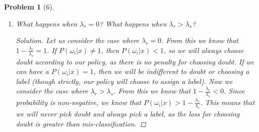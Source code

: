 \documentclass[11pt]{article}
\theoremstyle{quest}
\newtheorem*{problem}{Problem}
\newenvironment{solution}
  {\begin{mdframed}\begin{proof}[Solution]}
  {\end{proof}\end{mdframed}}
\begin{document}
\begin{problem}[6]
\begin{enumerate}[label=(\alph*)]
\begin{solution}
\begin{align*}
            \end{align*}
            The label we pick in this case minimizes $1 - P(\omega_i | x)$, which maximizes $P(\omega_i | x)$. That is, we pick the label $i$ such that
            \begin{align*}
                P(\omega_i | x) \ge P(\omega_j | x), \forall j
            \end{align*}
            \newline
            If $P(\omega_i | x) < 1 - \frac{\lambda_r}{\lambda_s}$, we choose doubt. This is the policy that minimizes risk, which is the same as the proposed policy.
            \end{solution}
        \item What happens when $\lambda_r = 0$? What happens when $\lambda_r > \lambda_s$?
            \begin{solution}
            Let us consider the case where $\lambda_r = 0$. From this we know that $1 - \frac{\lambda_r}{\lambda_s} = 1$. If $P(\omega_i | x) \neq 1$, then $P(\omega_i | x) < 1$, so we will always choose doubt according to our policy, as there is no penalty for choosing doubt. If we can have a $P(\omega_i | x) = 1$, then we will be indifferent to doubt or choosing a label (though strictly, our policy will choose to assign a label).
            \newline
            \newline
            Now we consider the case where $\lambda_r > \lambda_s$. From this we know that $1 - \frac{\lambda_r}{\lambda_s} < 0$. Since probability is non-negative, we know that $P(\omega_i | x) > 1 - \frac{\lambda_r}{\lambda_s}$. This means that we will never pick doubt and always pick a label, as the loss for choosing doubt is greater than mis-classification.
            \end{solution}
    \end{enumerate}
\end{problem}
\end{document}
